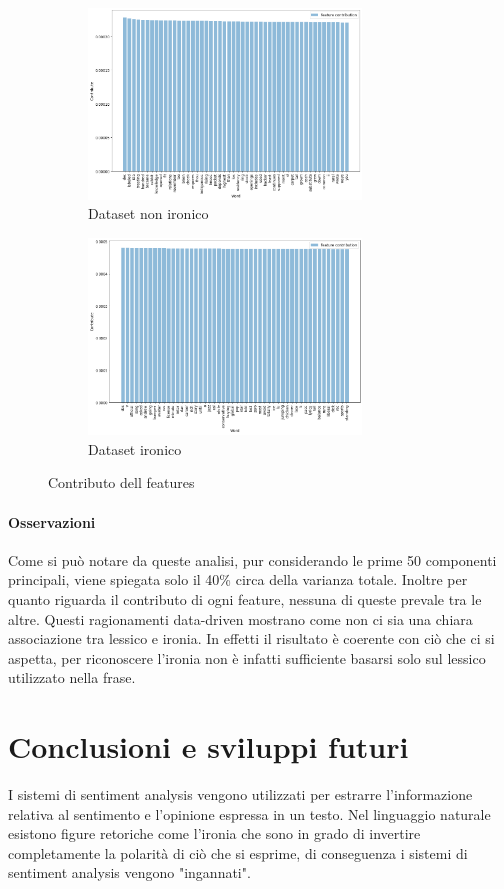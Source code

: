 \documentclass[oneside]{book}
\begin{document}
\begin{figure}[H]
	\begin{subfigure}[H]{0.5 \textwidth}
		\centering
		\includegraphics[width=7.25cm]{assets/pca/non_ironic/contribution.png}
		\caption{Dataset non ironico}
	\end{subfigure}
	\hfill
	\begin{subfigure}[H]{0.5 \textwidth}
		\centering
		\includegraphics[width=7.25cm]{assets/pca/ironic/contribution.png}
		\caption{Dataset ironico}
	\end{subfigure}
	\caption{Contributo dell features}
\end{figure}

\subsubsection{Osservazioni}
Come si può notare da queste analisi, pur considerando le prime 50 componenti principali, viene spiegata solo il 40\% circa della varianza totale. Inoltre per quanto riguarda il contributo di ogni feature, nessuna di queste prevale tra le altre. Questi ragionamenti data-driven mostrano come non ci sia una chiara associazione tra lessico e ironia. In effetti il risultato è coerente con ciò che ci si aspetta, per riconoscere l'ironia non è infatti sufficiente basarsi solo sul lessico utilizzato nella frase.

\chapter{Conclusioni e sviluppi futuri}
I sistemi di sentiment analysis vengono utilizzati per estrarre l'informazione relativa al sentimento e l'opinione espressa in un testo. Nel linguaggio naturale esistono figure retoriche come l'ironia che sono in grado di invertire completamente la polarità di ciò che si esprime, di conseguenza i sistemi di sentiment analysis vengono "ingannati".
\end{document}
